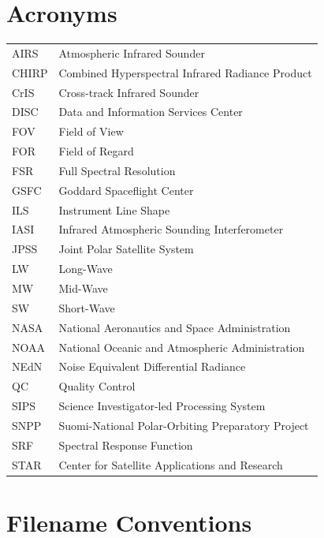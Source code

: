 \documentclass[12pt]{article}
\begin{document}



\appendix
\section{Acronyms}

\begin{center}
\begin{tabular}{ m{2cm} m{10cm} }
AIRS    & Atmospheric Infrared Sounder \\
CHIRP   & Combined Hyperspectral Infrared Radiance Product \\
CrIS    & Cross-track Infrared Sounder \\
DISC    & Data and Information Services Center \\
FOV     & Field of View \\
FOR     & Field of Regard \\
FSR     & Full Spectral Resolution \\
GSFC    & Goddard Spaceflight Center \\
ILS     & Instrument Line Shape \\
IASI    & Infrared Atmospheric Sounding Interferometer \\
JPSS    & Joint Polar Satellite System \\
LW      & Long-Wave \\
MW      & Mid-Wave \\
SW      & Short-Wave \\
NASA    & National Aeronautics and Space Administration \\
NOAA    & National Oceanic and Atmospheric Administration \\
NEdN    & Noise Equivalent Differential Radiance \\
QC      & Quality Control \\
SIPS    & Science Investigator-led Processing System \\
SNPP    & Suomi-National Polar-Orbiting Preparatory Project \\
SRF     & Spectral Response Function \\
STAR    & Center for Satellite Applications and Research \\
\end{tabular}
\end{center}

\section{Filename Conventions}
\end{document}

